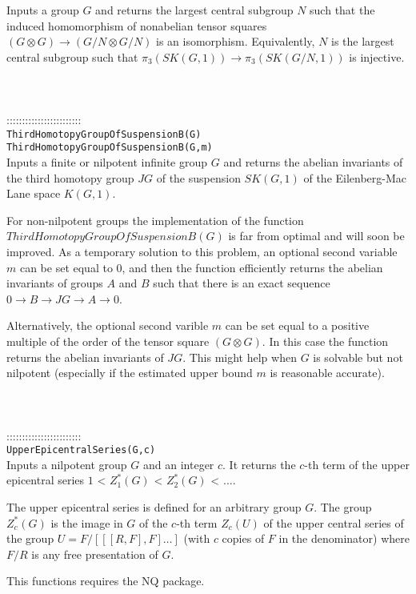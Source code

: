 \documentclass[a4paper,11pt]{report}
\begin{document}
{ Inputs a group $G$ and returns the largest central subgroup $N$ such that the induced homomorphism of nonabelian tensor squares $(G \otimes G) \longrightarrow (G/N \otimes G/N)$ is an isomorphism. Equivalently, $N$ is the largest central subgroup such that $\pi_3(SK(G,1)) \longrightarrow \pi_3(SK(G/N,1))$ is injective. \\
 \\
 \\
 \\
 ::::::::::::::::::::::::\\
 \texttt{ThirdHomotopyGroupOfSuspensionB(G) }\\
 \texttt{ThirdHomotopyGroupOfSuspensionB(G,m) }\\
 

 Inputs a finite or nilpotent infinite group $G$ and returns the abelian invariants of the third homotopy group $JG$ of the suspension $SK(G,1)$ of the Eilenberg-Mac Lane space $K(G,1)$. 

 For non-nilpotent groups the implementation of the function $ThirdHomotopyGroupOfSuspensionB(G)$ is far from optimal and will soon be improved. As a temporary solution to this
problem, an optional second variable $m$ can be set equal to $0$, and then the function efficiently returns the abelian invariants of groups $A$ and $B$ such that there is an exact sequence $0 \longrightarrow B \longrightarrow JG \longrightarrow A \longrightarrow 0$. 

 Alternatively, the optional second varible $m$ can be set equal to a positive multiple of the order of the tensor square $(G \otimes G)$. In this case the function returns the abelian invariants of $JG$. This might help when $G$ is solvable but not nilpotent (especially if the estimated upper bound $m$ is reasonable accurate). \\
 \\
 \\
 \\
 ::::::::::::::::::::::::\\
 \texttt{UpperEpicentralSeries(G,c) }\\
 

 Inputs a nilpotent group $G$ and an integer $c$. It returns the $c$-th term of the upper epicentral series $1$ {\textless} $ Z_1^\ast(G)$ {\textless} $Z_2^\ast(G)$ {\textless} $ \ldots $. 

 The upper epicentral series is defined for an arbitrary group $G$. The group $Z_c^\ast (G)$ is the image in $G$ of the $c$-th term $Z_c(U)$ of the upper central series of the group $U=F/[[[R,F],F] \ldots ]$ (with $c$ copies of $F$ in the denominator) where $F/R$ is any free presentation of $G$. 

 This functions requires the NQ package. \\
 \\
 \\
 }
\end{document}
